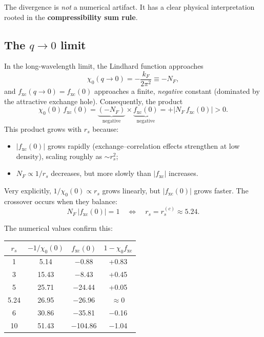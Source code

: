 \documentclass[aps,prb,twocolumn,superscriptaddress,floatfix]{revtex4-2}
\begin{document}
The divergence is \emph{not} a numerical artifact.
It has a clear physical interpretation rooted in the
\textbf{compressibility sum rule}.

\subsection{The $q \to 0$ limit}

In the long-wavelength limit, the Lindhard function approaches
\begin{equation}
    \chi_0(q \to 0) = -\frac{k_F}{2\pi^2} \equiv -N_F,
\end{equation}
and $f_{\mathrm{xc}}(q \to 0) = f_{\mathrm{xc}}(0)$ approaches a finite,
\emph{negative} constant (dominated by the attractive exchange hole).
Consequently, the product
\begin{equation}
    \chi_0(0)\,f_{\mathrm{xc}}(0)
    = \underbrace{(-N_F)}_{\text{negative}}
    \times \underbrace{f_{\mathrm{xc}}(0)}_{\text{negative}}
    = +|N_F\,f_{\mathrm{xc}}(0)| > 0.
\end{equation}
This product grows with $r_s$ because:
\begin{itemize}
    \item $|f_{\mathrm{xc}}(0)|$ grows rapidly (exchange--correlation effects
          strengthen at low density), scaling roughly as $\sim r_s^2$;
    \item $N_F \propto 1/r_s$ decreases, but more slowly than $|f_{\mathrm{xc}}|$
          increases.
\end{itemize}
Very explicitly, $1/\chi_0(0) \propto r_s$ grows linearly, but $|f_{\mathrm{xc}}(0)|$
grows faster.  The crossover occurs when they balance:
\begin{equation}
    N_F \,|f_{\mathrm{xc}}(0)| = 1
    \quad\Longleftrightarrow\quad
    r_s = r_s^{(c)} \approx 5.24.
\end{equation}

The numerical values confirm this:
\begin{center}
    \begin{tabular}{c c c c}
        \toprule
        $r_s$ & $-1/\chi_0(0)$ & $f_{\mathrm{xc}}(0)$ & $1{-}\chi_0 f_{\mathrm{xc}}$ \\
        \midrule
        1     & 5.14           & $-$0.88              & +0.83                        \\
        3     & 15.43          & $-$8.43              & +0.45                        \\
        5     & 25.71          & $-$24.44             & +0.05                        \\
        5.24  & 26.95          & $-$26.96             & $\approx 0$                  \\
        6     & 30.86          & $-$35.81             & $-$0.16                      \\
        10    & 51.43          & $-$104.86            & $-$1.04                      \\
        \bottomrule
    \end{tabular}
\end{center}
\end{document}
